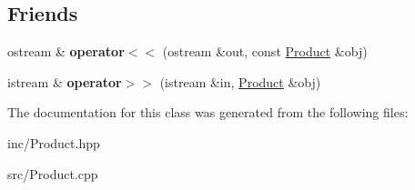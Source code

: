 \subsection*{Friends}
\begin{DoxyCompactItemize}
\item 
\mbox{\label{class_product_ad5a69cc0f60cb5ba3b01d430384efa47}} 
ostream \& {\bfseries operator$<$$<$} (ostream \&out, const \hyperlink{class_product}{Product} \&obj)
\item 
\mbox{\label{class_product_a0db1f7f5144f31ac438bf5ffdb70fc87}} 
istream \& {\bfseries operator$>$$>$} (istream \&in, \hyperlink{class_product}{Product} \&obj)
\end{DoxyCompactItemize}


The documentation for this class was generated from the following files\+:\begin{DoxyCompactItemize}
\item 
inc/Product.\+hpp\item 
src/Product.\+cpp\end{DoxyCompactItemize}
